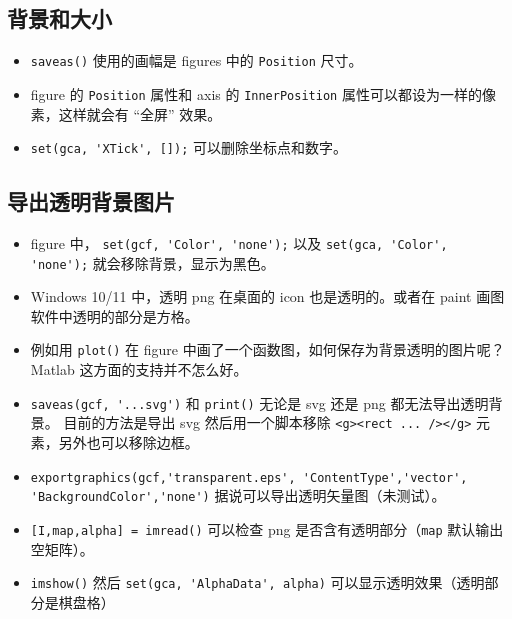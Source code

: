 
\subsection{背景和大小}
\begin{itemize}
\item \verb`saveas()` 使用的画幅是 figures 中的 \verb`Position` 尺寸。
\item figure 的 \verb`Position` 属性和 axis 的 \verb`InnerPosition` 属性可以都设为一样的像素，这样就会有 “全屏” 效果。
\item \verb`set(gca, 'XTick', []);` 可以删除坐标点和数字。
\end{itemize}

\subsection{导出透明背景图片}
\begin{itemize}
\item figure 中， \verb`set(gcf, 'Color', 'none');` 以及 \verb`set(gca, 'Color', 'none');` 就会移除背景，显示为黑色。
\item Windows 10/11 中，透明 png 在桌面的 icon 也是透明的。或者在 paint 画图软件中透明的部分是方格。
\item 例如用 \verb`plot()` 在 figure 中画了一个函数图，如何保存为背景透明的图片呢？ Matlab 这方面的支持并不怎么好。
\item \verb`saveas(gcf, '...svg')` 和 \verb`print()` 无论是 svg 还是 png 都无法导出透明背景。 目前的方法是导出 svg 然后用一个脚本移除 \verb`<g><rect ... /></g>` 元素，另外也可以移除边框。
\item \verb`exportgraphics(gcf,'transparent.eps', 'ContentType','vector', 'BackgroundColor','none')` 据说可以导出透明矢量图（未测试）。
\item \verb`[I,map,alpha] = imread()` 可以检查 png 是否含有透明部分（\verb`map` 默认输出空矩阵）。
\item \verb`imshow()` 然后 \verb`set(gca, 'AlphaData', alpha)` 可以显示透明效果（透明部分是棋盘格）
\end{itemize}



